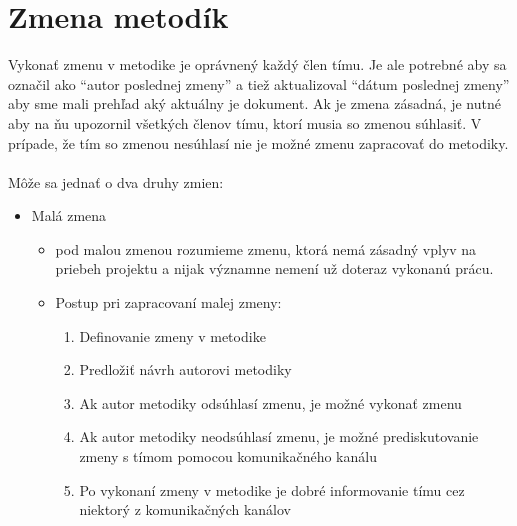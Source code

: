 \documentclass{article}
\begin{document}
    \section*{Zmena metodík}

        \textnormal{Vykonať zmenu v metodike je oprávnený každý člen tímu. Je ale potrebné aby sa označil ako “autor poslednej zmeny” a tiež aktualizoval “dátum poslednej zmeny” aby sme mali prehľad aký aktuálny je dokument. Ak je zmena zásadná, je nutné aby na ňu upozornil všetkých členov tímu, ktorí musia so zmenou súhlasiť. V prípade, že tím so zmenou nesúhlasí nie je možné zmenu zapracovať do metodiky.} \\\\
        \textnormal{Môže sa jednať o dva druhy zmien:}

        \begin{itemize}
            \item Malá zmena
            \begin{itemize}
                \item pod malou zmenou rozumieme zmenu, ktorá nemá zásadný vplyv na priebeh projektu a nijak významne nemení už doteraz vykonanú prácu.
                \item Postup pri zapracovaní malej zmeny:
                \begin{enumerate}
                    \item Definovanie zmeny v metodike
                    \item Predložiť návrh autorovi metodiky
                    \item Ak autor metodiky odsúhlasí zmenu, je možné vykonať zmenu
                    \item Ak autor metodiky neodsúhlasí zmenu, je možné prediskutovanie zmeny s tímom pomocou komunikačného kanálu
                    \item Po vykonaní zmeny v metodike je dobré informovanie tímu cez niektorý z komunikačných kanálov
                \end{enumerate}
            \end{itemize}


\end{itemize}
\end{document}
